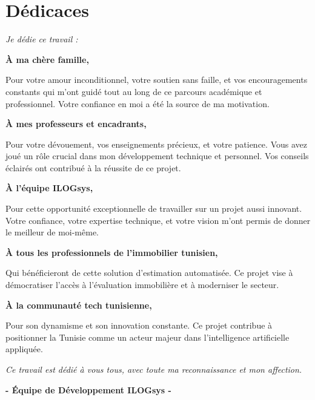 
\chapter*{Dédicaces}

\vspace{2cm}

\begin{center}
\textit{Je dédie ce travail :}
\end{center}

\vspace{1cm}

\textbf{À ma chère famille,}

Pour votre amour inconditionnel, votre soutien sans faille, et vos encouragements constants qui m'ont guidé tout au long de ce parcours académique et professionnel. Votre confiance en moi a été la source de ma motivation.

\vspace{0.8cm}

\textbf{À mes professeurs et encadrants,}

Pour votre dévouement, vos enseignements précieux, et votre patience. Vous avez joué un rôle crucial dans mon développement technique et personnel. Vos conseils éclairés ont contribué à la réussite de ce projet.

\vspace{0.8cm}

\textbf{À l'équipe ILOGsys,}

Pour cette opportunité exceptionnelle de travailler sur un projet aussi innovant. Votre confiance, votre expertise technique, et votre vision m'ont permis de donner le meilleur de moi-même.

\vspace{0.8cm}

\textbf{À tous les professionnels de l'immobilier tunisien,}

Qui bénéficieront de cette solution d'estimation automatisée. Ce projet vise à démocratiser l'accès à l'évaluation immobilière et à moderniser le secteur.

\vspace{0.8cm}

\textbf{À la communauté tech tunisienne,}

Pour son dynamisme et son innovation constante. Ce projet contribue à positionner la Tunisie comme un acteur majeur dans l'intelligence artificielle appliquée.

\vspace{1cm}

\begin{center}
\textit{Ce travail est dédié à vous tous, avec toute ma reconnaissance et mon affection.}

\vspace{1cm}

\textbf{- Équipe de Développement ILOGsys -}
\end{center}
